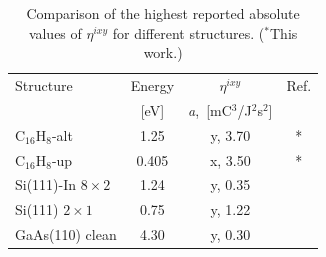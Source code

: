 \documentclass[aps,pra,11pt,tightenlines,showpacs,superscriptaddress,groupedaddress]{revtex4-1}
\newcommand{\ea}{$\eta^{ixy}$}
\newcommand{\altstc}{C$_{16}$H$_{8}$-alt}
\newcommand{\upstc}{C$_{16}$H$_{8}$-up}
\begin{document}
\begin{table}[]
    \caption{Comparison of the highest reported absolute values of {\ea} for different structures. ($^{*}$This work.)}
    \label{tab:etacomp}
    \centering
    \begin{ruledtabular}
    \begin{tabular}{lccc}
    Structure & Energy &{\ea} &  Ref.\\
              & [eV]   & \hspace{-2.5mm} \emph{a},\, [mC$^{3}$/J$^{2}$s$^{2}$] \\
    \hline
    {\altstc}               & 1.25  & y, 3.70  & *     \\
    {\upstc}                & 0.405 & x, 3.50  & *     \\
    Si(111)-In $8\times2$   & 1.24  & y, 0.35  & \cite{arzate2014optical}  \\
    Si(111) $2\times1$      & 0.75  & y, 1.22  & \cite{mendoza2012optical} \\
    GaAs(110) clean         & 4.30  & y, 0.30  & \cite{nastos2007full}     \\
    \end{tabular}
    \end{ruledtabular}
\end{table}
\end{document}
